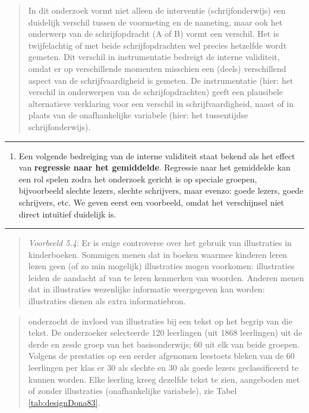 \documentclass[
]{book}
\providecommand{\tightlist}{%
  \setlength{\itemsep}{0pt}\setlength{\parskip}{0pt}}
\begin{document}
\begin{quote}
In dit onderzoek vormt niet alleen de interventie (schrijfonderwijs) een
duidelijk verschil tussen de voormeting en de nameting, maar ook het
onderwerp van de schrijfopdracht (A of B) vormt een verschil. Het is
twijfelachtig of met beide schrijfopdrachten wel precies hetzelfde wordt
gemeten. Dit verschil in instrumentatie bedreigt de interne validiteit,
omdat er op verschillende momenten misschien een (deels) verschillend
aspect van de schrijfvaardigheid is gemeten. De instrumentatie (hier:
het verschil in onderwerpen van de schrijfopdrachten) geeft een
plausibele alternatieve verklaring voor een verschil in
schrijfvaardigheid, naast of in plaats van de onafhankelijke variabele
(hier: het tussentijdse schrijfonderwijs).
\end{quote}

\begin{center}\rule{0.5\linewidth}{0.5pt}\end{center}

\begin{enumerate}
\def\labelenumi{\arabic{enumi}.}
\setcounter{enumi}{3}
\tightlist
\item
  Een volgende bedreiging van de interne validiteit staat bekend als
  het effect van \textbf{regressie naar het gemiddelde}. Regressie naar het
  gemiddelde kan een rol spelen zodra het onderzoek gericht is op speciale
  groepen, bijvoorbeeld slechte lezers, slechte schrijvers, maar evenzo:
  goede lezers, goede schrijvers, etc. We geven eerst een voorbeeld, omdat
  het verschijnsel niet direct intuïtief duidelijk is.
\end{enumerate}

\begin{center}\rule{0.5\linewidth}{0.5pt}\end{center}

\begin{quote}
\emph{Voorbeeld 5.4}:
Er is enige controverse over het gebruik van illustraties in
kinderboeken. Sommigen menen dat in boeken waarmee kinderen leren lezen
geen (of zo min mogelijk) illustraties mogen voorkomen: illustraties
leiden de aandacht af van te leren kenmerken van woorden. Anderen menen
dat in illustraties wezenlijke informatie weergegeven kan worden:
illustraties dienen als extra informatiebron.
\end{quote}

\begin{quote}
\citet{Dona83} onderzocht de invloed van illustraties bij een tekst op het begrip van
die tekst. De onderzoeker selecteerde 120 leerlingen (uit 1868
leerlingen) uit de derde en zesde groep van het basisonderwijs; 60 uit
elk van beide groepen. Volgens de prestaties op een eerder afgenomen
leestoets bleken van de 60 leerlingen per klas er 30 als slechte en 30
als goede lezers geclassificeerd te kunnen worden. Elke leerling kreeg
dezelfde tekst te zien, aangeboden met of zonder illustraties
(onafhankelijke variabele), zie Tabel \ref{tab:designDona83}.
\end{quote}
\end{document}
